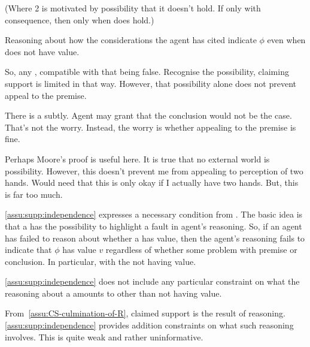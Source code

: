 \begin{note}
  {
    \color{red}
    (Where 2 is motivated by possibility that it doesn't hold. If only with consequence, then only when does hold.)
  }

    Reasoning about how the considerations the agent has cited indicate \(\phi\) even when \requ{} does not have value.

    So, any \requ{}, compatible with that being false.
    Recognise the possibility, claiming support is limited in that way.
    However, that possibility alone does not prevent appeal to the premise.

    There is a subtly.
    Agent may grant that the conclusion would not be the case.
    That's not the worry.
    Instead, the worry is whether appealing to the premise is fine.

    Perhaps Moore's proof is useful here.
    It is true that no external world is possibility.
    However, this doesn't prevent me from appealing to perception of two hands.
    Would need that this is only okay if I actually have two hands.
    But, this is far too much.
  

  \autoref{assu:supp:independence} expresses a necessary condition from \ideaCSB{}.
  The basic idea is that a \requ{} has the possibility to highlight a fault in agent's reasoning.
  So, if an agent has failed to reason about whether a \requ{} has {\color{red} value}, then the agent's reasoning fails to indicate that \(\phi\) has value \(v\) regardless of whether {\color{red} some problem with premise or conclusion}.
  {\color{red} In particular, with the \requ{} not having value.}

  \autoref{assu:supp:independence} does not include any particular constraint on what the reasoning about a \requ{} amounts to {\color{red} other than \requ{} not having value.}
\end{note}

\begin{note}
  From~\autoref{assu:CS-culmination-of-R}, claimed support is the result of reasoning.
  \autoref{assu:supp:independence} provides addition constraints on what such reasoning involves.
  This is quite weak and rather uninformative.
\end{note}

